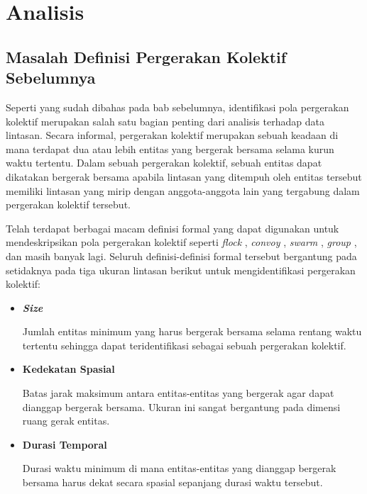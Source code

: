 \chapter{Analisis}
\label{chap:analisis}

\section{Masalah Definisi Pergerakan Kolektif Sebelumnya}
\label{sec:masalah-definisi-sebelumnya}

Seperti yang sudah dibahas pada bab sebelumnya, identifikasi pola pergerakan kolektif merupakan salah satu bagian penting dari analisis terhadap data lintasan. Secara informal, pergerakan kolektif merupakan sebuah keadaan di mana terdapat dua atau lebih entitas yang bergerak bersama selama kurun waktu tertentu. Dalam sebuah pergerakan kolektif, sebuah entitas dapat dikatakan bergerak bersama apabila lintasan yang ditempuh oleh entitas tersebut memiliki lintasan yang mirip dengan anggota-anggota lain yang tergabung dalam pergerakan kolektif tersebut.

Telah terdapat berbagai macam definisi formal yang dapat digunakan untuk mendeskripsikan pola pergerakan kolektif seperti \textit{flock} \cite{cao:flock, gudmundsson:flock}, \textit{convoy} \cite{jeung:convoys}, \textit{swarm} \cite{li:swarm}, \textit{group} \cite{buchin:group, yida:group}, dan masih banyak lagi. Seluruh definisi-definisi formal tersebut bergantung pada setidaknya pada tiga ukuran lintasan berikut untuk mengidentifikasi pergerakan kolektif:

\begin{itemize}
    \item \textbf{\textit{Size}}
    
    Jumlah entitas minimum yang harus bergerak bersama selama rentang waktu tertentu sehingga dapat teridentifikasi sebagai sebuah pergerakan kolektif.
    
    \item \textbf{Kedekatan Spasial}
    
    Batas jarak maksimum antara entitas-entitas yang bergerak agar dapat dianggap bergerak bersama. Ukuran ini sangat bergantung pada dimensi ruang gerak entitas.
    
    \item \textbf{Durasi Temporal}
    
    Durasi waktu minimum di mana entitas-entitas yang dianggap bergerak bersama harus dekat secara spasial sepanjang durasi waktu tersebut. 
\end{itemize}

